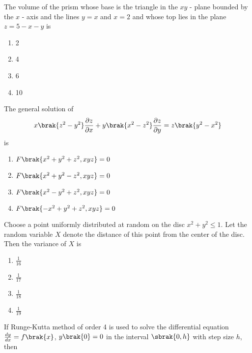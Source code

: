 \iffalse
\chapter{2007}
\author{AI24BTECH11009}
\section{xe}
\fi

\item The volume of the prism whose base is the triangle in the $xy$ - plane bounded by the $x$ - axis and the lines $y = x$ and $x = 2$ and whose top lies in the plane $z = 5 - x - y$ is
    \begin{enumerate}
        \item 2
        \item 4
        \item 6
        \item 10 \\
    \end{enumerate}
\item The general solution of 
\begin{align*}
    x\brak{z^2 - y^2}\frac{\partial z}{\partial x} + y\brak{x^2 - z^2}\frac{\partial z}{\partial y} = z\brak{y^2 - x^2}
\end{align*}
is
\begin{enumerate}
    \item $F\brak{x^2 + y^2 + z^2, xyz} = 0$
    \item $F\brak{x^2 + y^2 - z^2, xyz} = 0$
    \item $F\brak{x^2 - y^2 + z^2, xyz} = 0$
    \item $F\brak{-x^2 + y^2 + z^2, xyz} = 0$ \\
\end{enumerate}
\item Choose a point uniformly distributed at random on the disc $x^2 + y^2 \leq 1$. Let the random variable $X$ denote the distance of this point from the center of the disc. Then the variance of $X$ is 
\begin{enumerate}
    \item $\frac{1}{16}$
    \item $\frac{1}{17}$
    \item $\frac{1}{18}$
    \item $\frac{1}{19}$ \\
\end{enumerate}
\item If Runge-Kutta method of order 4 is used to solve the differential equation $\frac{dy}{dx} = f\brak{x}$, $y\brak{0} = 0$ in the interval $\sbrak{0, h}$ with step size $h$, then

